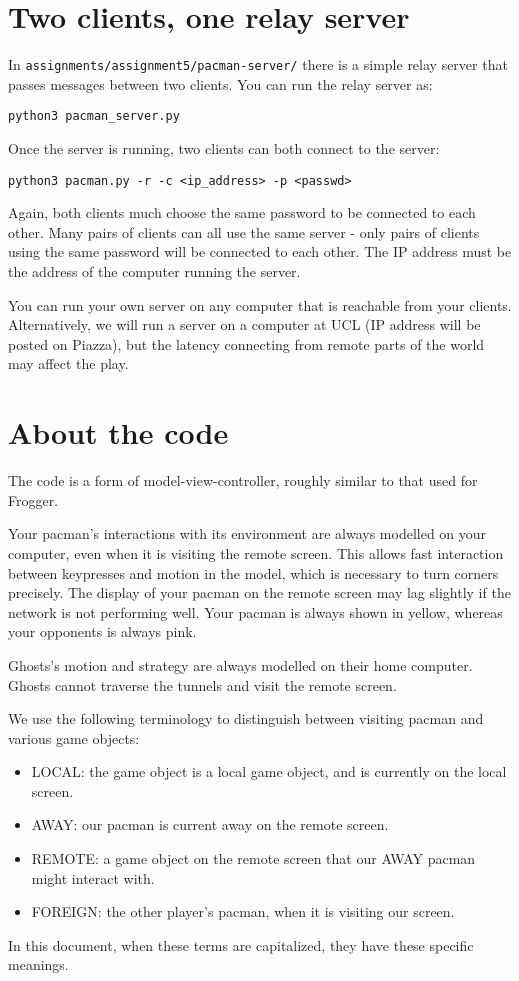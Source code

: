 \documentclass{article}
\begin{document}
\section{Two clients, one relay server}

In {\tt assignments/assignment5/pacman-server/} there is a simple
relay server that passes messages between two clients.  You can run
the relay server as:

\begin{verbatim}
python3 pacman_server.py
\end{verbatim}

Once the server is running, two clients can both connect to the server:

\begin{verbatim}
python3 pacman.py -r -c <ip_address> -p <passwd>
\end{verbatim}

Again, both clients much choose the same password to be connected to
each other.  Many pairs of clients can all use the same server - only
pairs of clients using the same password will be connected to each
other.  The IP address must be the address of the computer running the
server.

You can run your own server on any computer that is reachable from
your clients.  Alternatively, we will run a server on a computer at
UCL (IP address will be posted on Piazza), but the latency connecting
from remote parts of the world may affect the play.

\section{About the code}

The code is a form of model-view-controller, roughly similar to that
used for Frogger.

Your pacman's interactions with its environment are always modelled on
your computer, even when it is visiting the remote screen.  This
allows fast interaction between keypresses and motion in the model,
which is necessary to turn corners precisely.  The display of your
pacman on the remote screen may lag slightly if the network is not
performing well.  Your pacman is always shown in yellow, whereas your
opponents is always pink.

Ghosts's motion and strategy are always modelled on their home
computer. Ghosts cannot traverse the tunnels and visit the remote
screen.

We use the following terminology to distinguish between visiting pacman and various game objects:
\begin{itemize}
\item{LOCAL}: the game object is a local game object, and is currently on the local screen.
\item{AWAY}: our pacman is current away on the remote screen.
\item{REMOTE}: a game object on the remote screen that our AWAY pacman might interact with.
\item{FOREIGN}: the other player's pacman, when it is visiting our screen.
\end{itemize}
In this document, when these terms are capitalized, they have these
specific meanings.  
\end{document}
